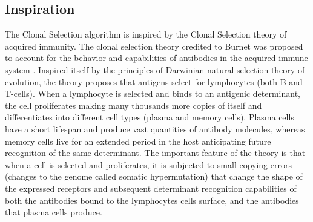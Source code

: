 \subsection{Inspiration}
The Clonal Selection algorithm is inspired by the Clonal Selection theory of acquired immunity.
The clonal selection theory credited to Burnet was proposed to account for the behavior and capabilities of antibodies in the acquired immune system \cite{Burnet1957, Burnet1959}. Inspired itself by the principles of Darwinian natural selection theory of evolution, the theory proposes that antigens select-for lymphocytes (both B and T-cells). When a lymphocyte is selected and binds to an antigenic determinant, the cell proliferates making many thousands more copies of itself and differentiates into different cell types (plasma and memory cells). Plasma cells have a short lifespan and produce vast quantities of antibody molecules, whereas memory cells live for an extended period in the host anticipating future recognition of the same determinant. The important feature of the theory is that when a cell is selected and proliferates, it is subjected to small copying errors (changes to the genome called somatic hypermutation) that change the shape of the expressed receptors and subsequent determinant recognition capabilities of both the antibodies bound to the lymphocytes cells surface, and the antibodies that plasma cells produce.

